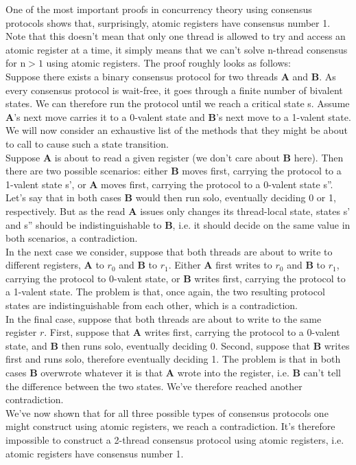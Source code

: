 \documentclass[main]{subfiles}
\begin{document}
\begin{example}
    One of the most important proofs in concurrency theory using consensus protocols shows that, surprisingly, atomic registers have consensus number 1. Note that this doesn't mean that only one thread is allowed to try and access an atomic register at a time, it simply means that we can't solve n-thread consensus for n$>1$ using atomic registers. The proof roughly looks as follows:\\[3mm]
    Suppose there exists a binary consensus protocol for two threads \textbf{A} and \textbf{B}. As every consensus protocol is wait-free, it goes through a finite number of bivalent states. We can therefore run the protocol until we reach a critical state s. Assume \textbf{A}'s next move carries it to a 0-valent state and \textbf{B}'s next move to a 1-valent state. We will now consider an exhaustive list of the methods that they might be about to call to cause such a state transition.\\[3mm]
    \indent Suppose \textbf{A} is about to read a given register (we don't care about \textbf{B} here). Then there are two possible scenarios: either \textbf{B} moves first, carrying the protocol to a 1-valent state s', or \textbf{A} moves first, carrying the protocol to a 0-valent state s''. Let's say that in both cases \textbf{B} would then run solo, eventually deciding 0 or 1, respectively. But as the read \textbf{A} issues only changes its thread-local state, states s' and s'' should be indistinguishable to \textbf{B}, i.e. it should decide on the same value in both scenarios, a contradiction.\\
    \indent In the next case we consider, suppose that both threads are about to write to different registers, \textbf{A} to $r_0$ and \textbf{B} to $r_1$. Either \textbf{A} first writes to $r_0$ and \textbf{B} to $r_1$, carrying the protocol to 0-valent state, or \textbf{B} writes first, carrying the protocol to a 1-valent state. The problem is that, once again, the two resulting protocol states are indistinguishable from each other, which is a contradiction.\\
    \indent In the final case, suppose that both threads are about to write to the same register $r$. First, suppose that \textbf{A} writes first, carrying the protocol to a 0-valent state, and \textbf{B} then runs solo, eventually deciding 0. Second, suppose that \textbf{B} writes first and runs solo, therefore eventually deciding 1. The problem is that in both cases \textbf{B} overwrote whatever it is that \textbf{A} wrote into the register, i.e. \textbf{B} can't tell the difference between the two states. We've therefore reached another contradiction.\\[3mm]
    We've now shown that for all three possible types of consensus protocols one might construct using atomic registers, we reach a contradiction. It's therefore impossible to construct a 2-thread consensus protocol using atomic registers, i.e. atomic registers have consensus number 1.
\end{example}
\end{document}
